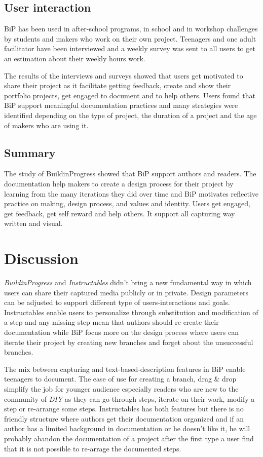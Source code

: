 \subsection{User interaction}

BiP has been used in after-school  programs, in school and in workshop challenges by students and makers who work on their own project. Teenagers and one adult facilitator have been interviewed and a weekly survey was sent to all users to get an estimation about their weekly hours work.

The results of the interviews and surveys showed that users get motivated to share their project as it facilitate getting feedback, create and show their portfolio projects, get engaged to document and to help others. Users found that BiP support meaningful documentation practices and many strategies were identified depending on the type of project, the duration of a project and the age of makers who are using it.

\subsection{Summary}

The study of BuildinProgress showed that BiP support authors and readers. The documentation help makers to create a design process for their project by learning from the many iterations they did over time and BiP motivates reflective practice on making, design process, and values and identity. Users get engaged, get feedback, get self reward and help others. It support all capturing way written and visual. 



\section{Discussion}

\textit{BuildinProgress} and \textit{Instructables} didn't bring a new fundamental way in which users can share their captured media publicly or in private. Design parameters can be adjusted to support different type of users-interactions and goals.  Instructables enable users to personalize through substitution and modification of a step and any missing step mean that authors should re-create their documentation while BiP focus more on the  design process where users can iterate their project by creating new branches and forget about the unsuccessful branches.

The mix between capturing and text-based-description features in BiP enable teenagers to document. The ease of use for creating a branch, drag \& drop simplify the job for younger audience especially readers who are new to the community of \textit{DIY} as they can go through steps, iterate on their work, modify a step or re-arrange some steps.  Instructables has both features but there is no friendly structure where authors get their documentation organized and if an author has a limited background in documentation or he doesn't like it, he will probably abandon the documentation of a project after the first type a user find that it is not possible to re-arrage the documented steps.

